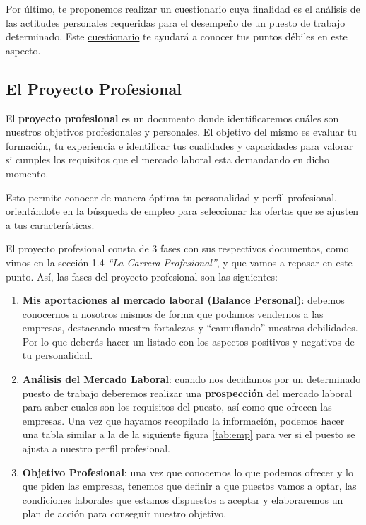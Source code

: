 Por último, te proponemos realizar un cuestionario cuya finalidad es el análisis de las actitudes personales requeridas para el desempeño de un puesto de trabajo determinado. Este \href{https://www.ich.es/Empleabilidad/FactPsicoOcupa/FactPsicoOcupa.php}{cuestionario} te ayudará a conocer tus puntos débiles en este aspecto.

\subsection{El Proyecto Profesional}
El \textbf{proyecto profesional} es un documento donde identificaremos cuáles son nuestros objetivos profesionales y personales. El objetivo del mismo es evaluar tu formación, tu experiencia e identificar tus cualidades y capacidades para valorar si cumples los requisitos que el mercado laboral esta demandando en dicho momento.

Esto permite conocer de manera óptima tu personalidad y perfil profesional, orientándote en la búsqueda de empleo para seleccionar las ofertas que se ajusten a tus características.

El proyecto profesional consta de 3 fases con sus respectivos documentos, como vimos en la sección 1.4 \textit{``La Carrera Profesional''}, y que vamos a repasar en este punto. Así, las fases del proyecto profesional son las siguientes:

\begin{enumerate}
    \item \textbf{Mis aportaciones al mercado laboral (Balance Personal)}: debemos conocernos a nosotros mismos de forma que podamos vendernos a las empresas, destacando nuestra fortalezas y ``camuflando'' nuestras debilidades. Por lo que deberás hacer un listado con los aspectos positivos y negativos de tu personalidad.
    \item \textbf{Análisis del Mercado Laboral}: cuando nos decidamos por un determinado puesto de trabajo deberemos realizar una \textbf{prospección} del mercado laboral para saber cuales son los requisitos del puesto, así como que ofrecen las empresas. Una vez que hayamos recopilado la información, podemos hacer una tabla similar a la de la siguiente figura \ref{tab:emp} para ver si el puesto se ajusta a nuestro perfil profesional.

    \item \textbf{Objetivo Profesional}: una vez que conocemos lo que podemos ofrecer y lo que piden las empresas, tenemos que definir a que puestos vamos a optar, las condiciones laborales que estamos dispuestos a aceptar y elaboraremos un plan de acción para conseguir nuestro objetivo.
\end{enumerate}

